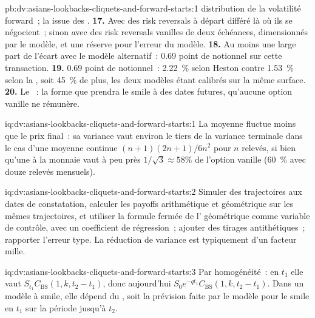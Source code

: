 \begin{solution}{pb:dv:asians-lookbacks-cliquets-and-forward-starts:1}
distribution de la volatilité forward~; la  issue des .
\textbf{17.} Avec des risk reversals à départ différé là où ils se négocient~; sinon avec des risk reversals vanilles de deux échéances,
dimensionnés par le modèle, et une réserve pour l'erreur du modèle.
\textbf{18.} Au moins une large part de l'écart avec le modèle alternatif~: 0.69 point de notionnel sur cette transaction.
\textbf{19.} 0.69 point de notionnel~: 2.22~\% selon Heston contre 1.53~\% selon la , soit 45~\% de plus, les deux modèles étant calibrés sur
la même surface.
\textbf{20.} Le ~: la forme que prendra le smile à des dates futures, qu'aucune option vanille ne rémunère.
\end{solution}

\begin{solution}{iq:dv:asians-lookbacks-cliquets-and-forward-starts:1}
La moyenne fluctue moins que le prix final~: sa variance vaut environ le tiers de la variance terminale dans le cas d'une moyenne continue
$(n+1)(2n+1)/6n^2$ pour $n$ relevés, si bien qu'une  à la monnaie vaut à peu près $1/\sqrt3\approx58\%$ de l'option vanille
(60~\% avec douze relevés mensuels).
\end{solution}

\begin{solution}{iq:dv:asians-lookbacks-cliquets-and-forward-starts:2}
Simuler des trajectoires aux dates de constatation, calculer les payoffs arithmétique et géométrique sur les mêmes trajectoires, et utiliser la
formule fermée de l' géométrique comme variable de contrôle, avec un coefficient de régression~; ajouter des tirages antithétiques~; rapporter
l'erreur type. La réduction de variance est typiquement d'un facteur mille.
\end{solution}

\begin{solution}{iq:dv:asians-lookbacks-cliquets-and-forward-starts:3}
Par homogénéité~: en $t_1$ elle vaut $S_{t_1}C_{\mathrm{BS}}(1,k,t_2-t_1)$, donc aujourd'hui $S_0e^{-qt_1}C_{\mathrm{BS}}(1,k,t_2-t_1)$. Dans un
modèle à smile, elle dépend du , soit la prévision faite par le modèle pour le smile en $t_1$ sur la période jusqu'à $t_2$.
\end{solution}

